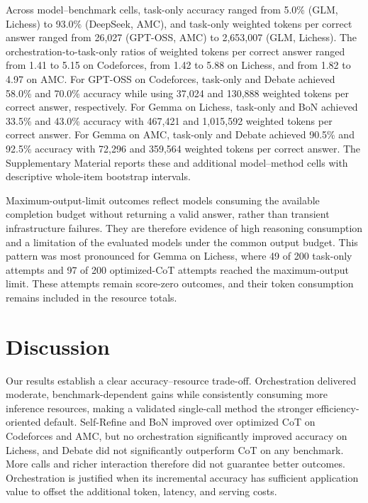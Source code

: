 \documentclass[a4paper]{article}
\theoremstyle{plain}
\theoremstyle{definition}
\theoremstyle{remark}
\begin{document}
Across model--benchmark cells, task-only accuracy ranged from 5.0\% (GLM, Lichess) to 93.0\% (DeepSeek, AMC), and task-only weighted tokens per correct answer ranged from 26{,}027 (GPT-OSS, AMC) to 2{,}653{,}007 (GLM, Lichess).
The orchestration-to-task-only ratios of weighted tokens per correct answer ranged from 1.41 to 5.15 on Codeforces, from 1.42 to 5.88 on Lichess, and from 1.82 to 4.97 on AMC.
For GPT-OSS on Codeforces, task-only and Debate achieved 58.0\% and 70.0\% accuracy while using 37{,}024 and 130{,}888 weighted tokens per correct answer, respectively.
For Gemma on Lichess, task-only and BoN achieved 33.5\% and 43.0\% accuracy with 467{,}421 and 1{,}015{,}592 weighted tokens per correct answer.
For Gemma on AMC, task-only and Debate achieved 90.5\% and 92.5\% accuracy with 72{,}296 and 359{,}564 weighted tokens per correct answer.
The Supplementary Material reports these and additional model--method cells with descriptive whole-item bootstrap intervals.

Maximum-output-limit outcomes reflect models consuming the available completion budget without returning a valid answer, rather than transient infrastructure failures.
They are therefore evidence of high reasoning consumption and a limitation of the evaluated models under the common output budget.
This pattern was most pronounced for Gemma on Lichess, where 49 of 200 task-only attempts and 97 of 200 optimized-CoT attempts reached the maximum-output limit.
These attempts remain score-zero outcomes, and their token consumption remains included in the resource totals.

\section{Discussion}
\label{discussion}

Our results establish a clear accuracy--resource trade-off.
Orchestration delivered moderate, benchmark-dependent gains while consistently consuming more inference resources, making a validated single-call method the stronger efficiency-oriented default.
Self-Refine and BoN improved over optimized CoT on Codeforces and AMC, but no orchestration significantly improved accuracy on Lichess, and Debate did not significantly outperform CoT on any benchmark.
More calls and richer interaction therefore did not guarantee better outcomes.
Orchestration is justified when its incremental accuracy has sufficient application value to offset the additional token, latency, and serving costs.
\end{document}
